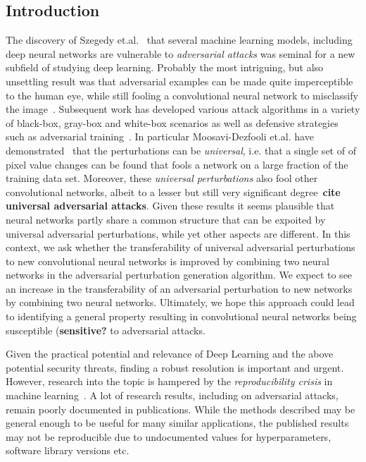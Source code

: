 \documentclass[runningheads]{llncs}
\begin{document}
\subsection{Introduction}
The discovery of Szegedy et.al.~\cite{Szegedy_2014} that several machine learning models, including deep neural networks are vulnerable to \emph{adversarial attacks} was seminal for a new subfield of studying deep learning. Probably the most intriguing, but also unsettling result was that adversarial examples can be made quite imperceptible to the human eye, while still fooling a convolutional neural network to misclassify the image~\cite{goodfellow_2014}. Subsequent work has developed various attack algorithms in a variety of black-box, gray-box and white-box scenarios as well as defensive strategies such as adversarial training~\cite{REN2020346}. In particular Moosavi-Dezfooli et.al. have demonstrated~\cite{moosavi-dezfooli_universal_2017} that the perturbations can be \emph{universal}, i.e. that a single set of of pixel value changes can be found that fools a network on a large fraction of the training data set. Moreover, these \emph{universal perturbations} also fool other convolutional networks, albeit to a lesser but still very significant degree~{\bf cite universal adversarial attacks}. 
Given these results it seems plausible that neural networks partly share a common structure that can be expoited by universal adversarial perturbations, while yet other aspects are different. In this context, we ask whether the transferability of universal adversarial perturbations to new convolutional neural networks is improved by combining two neural networks in the adversarial perturbation generation algorithm. We expect to see an increase in the transferability of an adversarial perturbation to new networks by combining two neural networks. Ultimately, we hope this approach could lead to identifying a general property resulting in convolutional neural networks being susceptible ({\bf sensitive?} to adversarial attacks.

Given the practical potential and relevance of Deep Learning and the above potential security threats, finding a robust resolution is important and urgent. However, research into the topic is hampered by the \emph{reproducibility crisis} in machine learning~\cite{raff2020quantifying}. A lot of research results, including on adversarial attacks, remain poorly documented in publications. While the methods described may be general enough to be useful for many similar applications, 
the published results may not be reproducible due to undocumented values for hyperparameters, software library versions etc.
\end{document}

